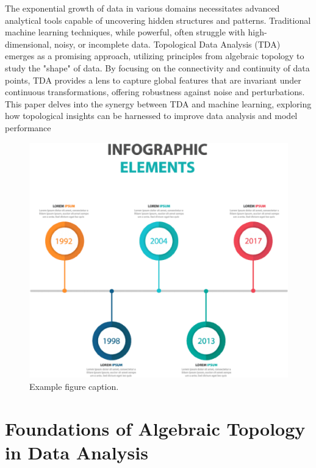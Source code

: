 \documentclass[9pt, twoside, twocolumn]{extarticle}
\begin{document}
\titleblock

    The exponential growth of data in various domains necessitates advanced analytical tools capable of uncovering hidden structures and patterns. Traditional machine learning techniques, while powerful, often struggle with high-dimensional, noisy, or incomplete data. Topological Data Analysis (TDA) emerges as a promising approach, utilizing principles from algebraic topology to study the "shape" of data. By focusing on the connectivity and continuity of data points, TDA provides a lens to capture global features that are invariant under continuous transformations, offering robustness against noise and perturbations. This paper delves into the synergy between TDA and machine learning, exploring how topological insights can be harnessed to improve data analysis and model performance

    \begin{figure}[htbp]
        \centering
        \includegraphics[width=0.8\linewidth]{diagram.png}
        \caption{Example figure caption.}
        \label{fig:example}
    \end{figure}


\section*{Foundations of Algebraic Topology in Data Analysis}
\end{document}
